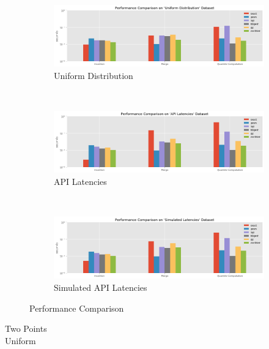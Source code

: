 \documentclass{article}
\theoremstyle{plain}
\theoremstyle{remark}
\begin{document}
\begin{figure}
    \centering
    \begin{subfigure}[b]{0.3\textwidth}
        \includegraphics[width=\textwidth]{evaluation/images/Uniform_Distribution_perf.png}
        \caption{Uniform Distribution}
    \end{subfigure}
    ~
    \begin{subfigure}[b]{0.3\textwidth}
        \includegraphics[width=\textwidth]{evaluation/images/API_Latencies_perf.png}
        \caption{API Latencies}
    \end{subfigure}
    ~
    \begin{subfigure}[b]{0.3\textwidth}
        \includegraphics[width=\textwidth]{evaluation/images/Simulated_Latencies_perf.png}
        \caption{Simulated API Latencies}
    \end{subfigure}
    \caption{Performance Comparison}
\end{figure}


Two Points\\



Uniform\\


\end{document}
